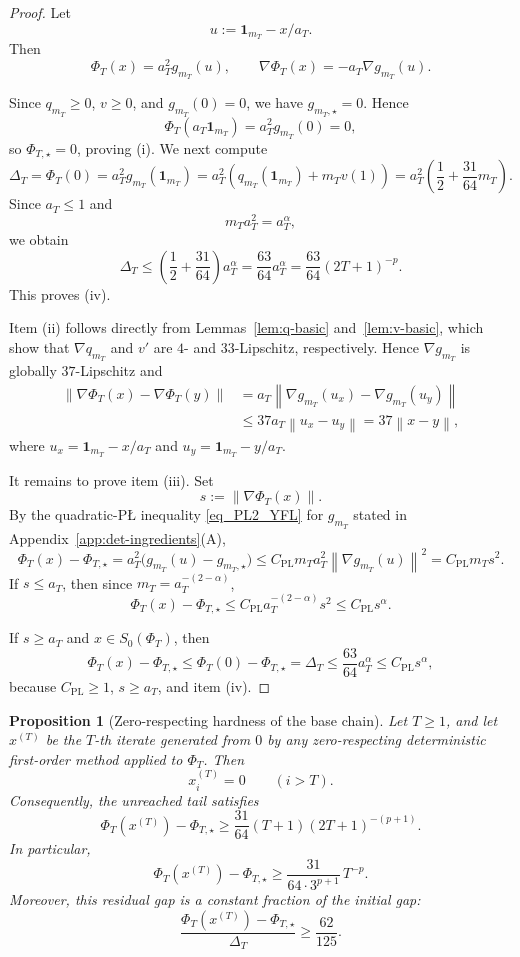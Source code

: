 \documentclass[11pt]{article}
\newtheorem{proposition}[theorem]{Proposition}
\newcommand{\norm}[1]{\left\lVert #1\right\rVert}
\newcommand{\one}{\mathbf{1}}
\begin{document}
\begin{proof}
Let
\[
u:=\one_{m_T}-x/a_T.
\]
Then
\[
\Phi_T(x)=a_T^2 g_{m_T}(u),
\qquad
\nabla \Phi_T(x)=-a_T\nabla g_{m_T}(u).
\]

Since $q_{m_T}\ge 0$, $v\ge 0$, and $g_{m_T}(0)=0$, we have $g_{m_T,\star}=0$. Hence
\[
	\Phi_T(a_T\one_{m_T})=a_T^2g_{m_T}(0)=0,
	\]
so $\Phi_{T,\star}=0$, proving (i). We next compute
	\[
	\Delta_T
=
\Phi_T(0)
=
a_T^2 g_{m_T}(\one_{m_T})
=
a_T^2\left(q_{m_T}(\one_{m_T})+m_Tv(1)\right)
=
a_T^2\left(\frac12+\frac{31}{64}m_T\right).
\]
Since $a_T\le 1$ and
\[
m_Ta_T^2=a_T^\alpha,
\]
we obtain
\[
\Delta_T
\le
\left(\frac12+\frac{31}{64}\right)a_T^\alpha
=
\frac{63}{64}a_T^\alpha
=
\frac{63}{64}(2T+1)^{-p}.
\]
This proves (iv).

Item (ii) follows directly from Lemmas~\ref{lem:q-basic} and~\ref{lem:v-basic}, which show that \(\nabla q_{m_T}\)
and \(v'\) are \(4\)- and \(33\)-Lipschitz, respectively.
Hence $\nabla g_{m_T}$ is globally $37$-Lipschitz and
\[
\begin{aligned}
\norm{\nabla \Phi_T(x)-\nabla \Phi_T(y)}
&=
a_T\norm{\nabla g_{m_T}(u_x)-\nabla g_{m_T}(u_y)}\\
&\le
37a_T\norm{u_x-u_y}
=
37\norm{x-y},
\end{aligned}
\]
where $u_x=\one_{m_T}-x/a_T$ and $u_y=\one_{m_T}-y/a_T$.

It remains to prove item (iii). Set
\[
s:=\norm{\nabla \Phi_T(x)}.
\]
By the quadratic-P\L{} inequality \eqref{eq_PL2_YFL} for $g_{m_{T}}$ stated in Appendix~\ref{app:det-ingredients}(A),
\[
\Phi_T(x)-\Phi_{T,\star}
=
a_T^2\bigl(g_{m_T}(u)-g_{m_T,\star}\bigr)
\le
C_{\mathrm{PL}}m_Ta_T^2\norm{\nabla g_{m_T}(u)}^2
=
C_{\mathrm{PL}}m_Ts^2.
\]
If $s\le a_T$, then since $m_T=a_T^{-(2-\alpha)}$,
\[
\Phi_T(x)-\Phi_{T,\star}
\le
C_{\mathrm{PL}}a_T^{-(2-\alpha)}s^2
\le
C_{\mathrm{PL}}s^\alpha.
\]

\noindent If $s\ge a_T$ and $x\in S_0(\Phi_T)$, then
\[
\Phi_T(x)-\Phi_{T,\star}
\le
\Phi_T(0)-\Phi_{T,\star}
=
\Delta_T
\le
\frac{63}{64}a_T^\alpha
\le
C_{\mathrm{PL}}s^\alpha,
\]
because \(C_{\mathrm{PL}}\ge 1\), \(s\ge a_T\), and item (iv).

\end{proof}

\begin{proposition}[Zero-respecting hardness of the base chain]
\label{prop:base-hardness-zr}
Let \(T\ge1\), and let \(x^{(T)}\) be the \(T\)-th iterate generated from \(0\) by any zero-respecting deterministic
first-order method applied to \(\Phi_T\). Then
\[
x^{(T)}_i=0
\qquad (i>T).
\]
Consequently, the unreached tail satisfies
\[
\Phi_T(x^{(T)})-\Phi_{T,\star}
\ge
\frac{31}{64}(T+1)(2T+1)^{-(p+1)}.
\]
In particular,
\[
\Phi_T(x^{(T)})-\Phi_{T,\star}
\ge
\frac{31}{64\cdot 3^{p+1}}\,T^{-p}.
\]
Moreover,
this residual gap is a constant fraction of the initial gap:
\[
\frac{\Phi_T(x^{(T)})-\Phi_{T,\star}}{\Delta_T}\ge \frac{62}{125}.
\]
\end{proposition}
\end{document}

